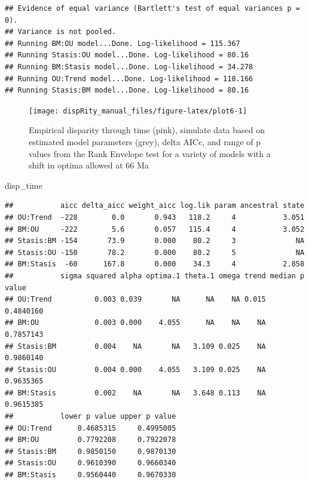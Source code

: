 \documentclass[]{book}
\newenvironment{Shaded}{\begin{snugshade}}{\end{snugshade}}
\newcommand{\NormalTok}[1]{#1}
\theoremstyle{definition}
\theoremstyle{definition}
\theoremstyle{definition}
\theoremstyle{remark}
\begin{document}
\begin{verbatim}
## Evidence of equal variance (Bartlett's test of equal variances p = 0).
## Variance is not pooled.
## Running BM:OU model...Done. Log-likelihood = 115.367
## Running Stasis:OU model...Done. Log-likelihood = 80.16
## Running BM:Stasis model...Done. Log-likelihood = 34.278
## Running OU:Trend model...Done. Log-likelihood = 118.166
## Running Stasis:BM model...Done. Log-likelihood = 80.16
\end{verbatim}

\begin{figure}

{\centering \texttt{[image: dispRity\_manual\_files/figure-latex/plot6-1]} 

}

\caption{Empirical disparity through time (pink), simulate data based on estimated model parameters (grey), delta AICc, and range of p values from the Rank Envelope test for a variety of models with a shift in optima allowed at 66 Ma}\label{fig:plot6}
\end{figure}

\begin{Shaded}
\begin{Highlighting}[]
\NormalTok{disp_time}
\end{Highlighting}
\end{Shaded}

\begin{verbatim}
##           aicc delta_aicc weight_aicc log.lik param ancestral state
## OU:Trend  -228        0.0       0.943   118.2     4           3.051
## BM:OU     -222        5.6       0.057   115.4     4           3.052
## Stasis:BM -154       73.9       0.000    80.2     3              NA
## Stasis:OU -150       78.2       0.000    80.2     5              NA
## BM:Stasis  -60      167.8       0.000    34.3     4           2.858
##           sigma squared alpha optima.1 theta.1 omega trend median p value
## OU:Trend          0.003 0.039       NA      NA    NA 0.015      0.4840160
## BM:OU             0.003 0.000    4.055      NA    NA    NA      0.7857143
## Stasis:BM         0.004    NA       NA   3.109 0.025    NA      0.9860140
## Stasis:OU         0.004 0.000    4.055   3.109 0.025    NA      0.9635365
## BM:Stasis         0.002    NA       NA   3.648 0.113    NA      0.9615385
##           lower p value upper p value
## OU:Trend      0.4685315     0.4995005
## BM:OU         0.7792208     0.7922078
## Stasis:BM     0.9850150     0.9870130
## Stasis:OU     0.9610390     0.9660340
## BM:Stasis     0.9560440     0.9670330
\end{verbatim}
\end{document}
